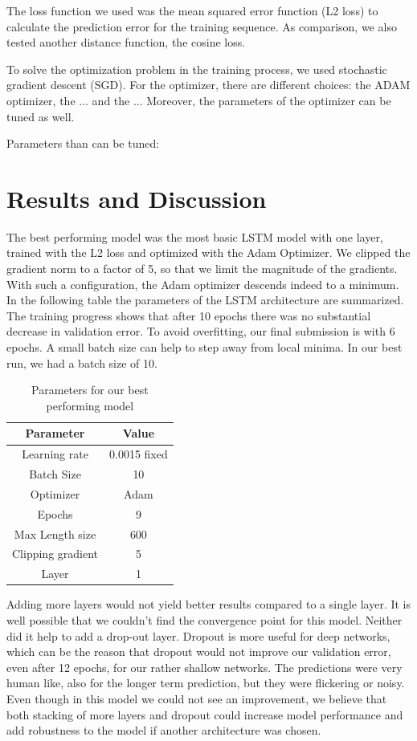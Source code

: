 The loss function we used was the mean squared error function (L2 loss) to calculate the prediction error for the training sequence. As comparison, we also tested another distance function, the cosine loss. 

To solve the optimization problem in the training process, we used stochastic gradient descent (SGD). For the optimizer, there are different choices: the ADAM optimizer, the ... and the ... Moreover, the parameters of the optimizer can be tuned as well. 

Parameters than can be tuned:


\section{Results and Discussion}

The best performing model was the most basic LSTM model with one layer, trained with the L2 loss and optimized with the Adam Optimizer. We clipped the gradient norm to a factor of 5, so that we limit the magnitude of the gradients. With such a configuration, the Adam optimizer descends indeed to a minimum. In the following table the parameters of the LSTM architecture are summarized. The training progress shows that after 10 epochs there was no substantial decrease in validation error. To avoid overfitting, our final submission is with 6 epochs. A small batch size can help to step away from local minima. In our best run, we had a batch size of 10. 

\begin{table}[]
	\centering
	\caption{Parameters for our best performing model }
	\label{my-label}
	\begin{tabular}{cc}
		Parameter& Value \\
		\hline
		\hline
		Learning rate  &  0.0015 fixed    \\
		Batch Size  & 10 \\
		Optimizer  & Adam  \\
		Epochs  & 9 \\
		Max Length size  &  600 \\
		Clipping gradient &  5\\
		Layer & 1 \\
		\hline
	\end{tabular}
\end{table}

Adding more layers would not yield better results compared to a single layer. It is well possible that we couldn't find the convergence point for this model. Neither did it help to add a drop-out layer. Dropout is more useful for deep networks, which can be the reason that dropout would not improve our validation error, even after 12 epochs, for our rather shallow networks. The predictions were very human like, also for the longer term prediction, but they were flickering or noisy. Even though in this model we could not see an improvement, we believe that both stacking of more layers and dropout could increase model performance and add robustness to the model if another architecture was chosen. 

